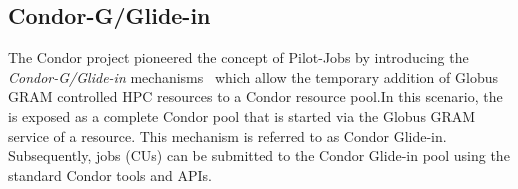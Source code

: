\documentclass[conference]{IEEEtran}
\begin{document}


\subsection{Condor-G/Glide-in}



The Condor project pioneered the concept of Pilot-Jobs by introducing the
\textit{Condor-G/Glide-in} mechanisms~\cite{condor-g} which allow the
temporary addition of Globus GRAM controlled HPC resources to a Condor
resource pool.In this scenario, the \pilot is exposed as a complete Condor
pool that is started via the Globus GRAM service of a resource. This mechanism
is referred to as Condor Glide-in. Subsequently, jobs (CUs) can be submitted
to the Condor Glide-in pool using the standard Condor tools and APIs.

% 
\end{document}
